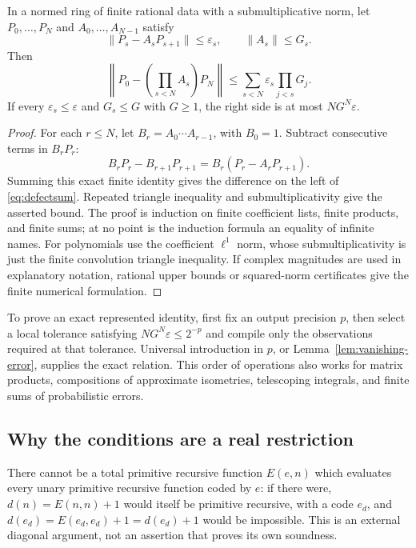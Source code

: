 \begin{lemma}
\label{lem:defects}
In a normed ring of finite rational data with a submultiplicative norm,
let $P_0,\ldots,P_N$ and $A_0,\ldots,A_{N-1}$ satisfy
\[
 \|P_s-A_sP_{s+1}\|\le\varepsilon_s,
 \qquad \|A_s\|\le G_s.
\]
Then
\begin{equation}
 \left\|P_0-\left(\prod_{s<N}A_s\right)P_N\right\|
 \le \sum_{s<N}\varepsilon_s\prod_{j<s}G_j.     \label{eq:defectsum}
\end{equation}
If every $\varepsilon_s\le\varepsilon$ and $G_s\le G$ with $G\ge1$,
the right side is at most $NG^N\varepsilon$.
\end{lemma}
\begin{proof}
For each $r\le N$, let $B_r=A_0\cdots A_{r-1}$, with $B_0=1$.
Subtract consecutive terms in $B_rP_r$:
\[
 B_rP_r-B_{r+1}P_{r+1}=B_r(P_r-A_rP_{r+1}).
\]
Summing this exact finite identity gives the difference on the left of
\eqref{eq:defectsum}. Repeated triangle inequality and
submultiplicativity give the asserted bound. The proof is induction on
finite coefficient lists, finite products, and finite sums; at no point
is the induction formula an equality of infinite names. For polynomials
use the coefficient $\ell^1$ norm, whose submultiplicativity is just the
finite convolution triangle inequality. If complex magnitudes are used
in explanatory notation, rational upper bounds or squared-norm
certificates give the finite numerical formulation.
\end{proof}

To prove an exact represented identity, first fix an output precision
$p$, then select a local tolerance satisfying
$NG^N\varepsilon\le2^{-p}$ and compile only the observations required at
that tolerance. Universal introduction in $p$, or
Lemma~\ref{lem:vanishing-error}, supplies the exact relation. This order
of operations also works for matrix products, compositions of approximate
isometries, telescoping integrals, and finite sums of probabilistic errors.

\subsection{Why the conditions are a real restriction}

There cannot be a total primitive recursive function $E(e,n)$ which
evaluates every unary primitive recursive function coded by $e$: if there
were, $d(n)=E(n,n)+1$ would itself be primitive recursive, with a code
$e_d$, and $d(e_d)=E(e_d,e_d)+1=d(e_d)+1$ would be impossible.
This is an external diagonal argument, not an assertion that \iPRA{}
proves its own soundness.

